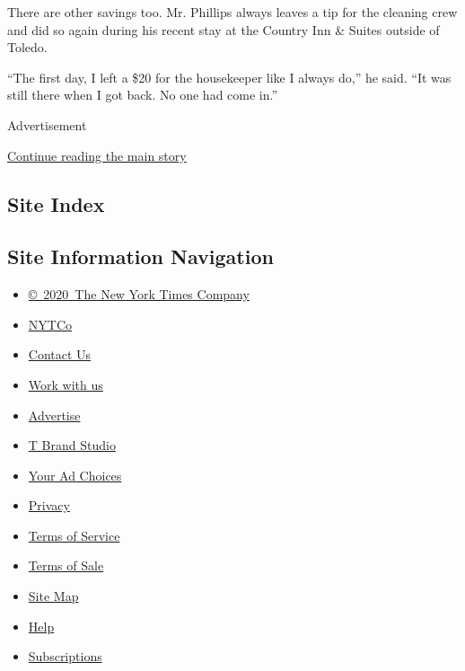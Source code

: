 There are other savings too. Mr. Phillips always leaves a tip for the
cleaning crew and did so again during his recent stay at the Country Inn
\& Suites outside of Toledo.

``The first day, I left a \$20 for the housekeeper like I always do,''
he said. ``It was still there when I got back. No one had come in.''

Advertisement

\protect\hyperlink{after-bottom}{Continue reading the main story}

\hypertarget{site-index}{%
\subsection{Site Index}\label{site-index}}

\hypertarget{site-information-navigation}{%
\subsection{Site Information
Navigation}\label{site-information-navigation}}

\begin{itemize}
\tightlist
\item
  \href{https://help.nytimes.com/hc/en-us/articles/115014792127-Copyright-notice}{©~2020~The
  New York Times Company}
\end{itemize}

\begin{itemize}
\tightlist
\item
  \href{https://www.nytco.com/}{NYTCo}
\item
  \href{https://help.nytimes.com/hc/en-us/articles/115015385887-Contact-Us}{Contact
  Us}
\item
  \href{https://www.nytco.com/careers/}{Work with us}
\item
  \href{https://nytmediakit.com/}{Advertise}
\item
  \href{http://www.tbrandstudio.com/}{T Brand Studio}
\item
  \href{https://www.nytimes.com/privacy/cookie-policy\#how-do-i-manage-trackers}{Your
  Ad Choices}
\item
  \href{https://www.nytimes.com/privacy}{Privacy}
\item
  \href{https://help.nytimes.com/hc/en-us/articles/115014893428-Terms-of-service}{Terms
  of Service}
\item
  \href{https://help.nytimes.com/hc/en-us/articles/115014893968-Terms-of-sale}{Terms
  of Sale}
\item
  \href{https://spiderbites.nytimes.com}{Site Map}
\item
  \href{https://help.nytimes.com/hc/en-us}{Help}
\item
  \href{https://www.nytimes.com/subscription?campaignId=37WXW}{Subscriptions}
\end{itemize}
